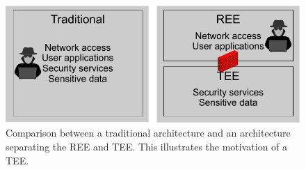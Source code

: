 \begin{figure}[htpb]
  \centering
  \includegraphics[width=0.8\linewidth]{figures/TEE-motivation.pdf}
  \caption{Comparison between a traditional architecture and an architecture separating the REE and TEE\@. This illustrates the motivation of a TEE\@.}\label{fig:tee_motivation}
\end{figure}
